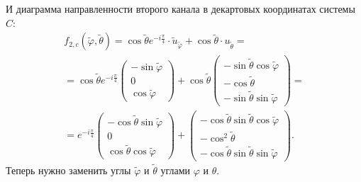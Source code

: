 И диаграмма направленности второго канала в декартовых координатах системы $C$:
\begin{multline*}
    f_{2,c}(\widetilde{\varphi}, \widetilde{\theta})
    = \cos \widetilde{\theta} e^{-i\frac{\pi}{4}} \cdot \widetilde{u}_{\widetilde{\varphi}} + \cos \widetilde{\theta} \cdot u_{\widetilde{\theta}} = \\
    = \cos \widetilde{\theta}  e^{-i\frac{\pi}{4}}
    \begin{pmatrix}
        - \sin \widetilde{\varphi} \\
        0                          \\
        \cos \widetilde{\varphi}
    \end{pmatrix}
    + \cos \widetilde{\theta}
    \begin{pmatrix}
        - \sin \widetilde{\theta} \cos \widetilde{\varphi} \\
        - \cos \widetilde{\theta}                          \\
        - \sin \widetilde{\theta} \sin \widetilde{\varphi}
    \end{pmatrix} = \\
    = e^{-i\frac{\pi}{4}}
    \begin{pmatrix}
        - \cos \widetilde{\theta}  \sin \widetilde{\varphi} \\
        0                                                   \\
        \cos \widetilde{\theta} \cos \widetilde{\varphi}
    \end{pmatrix}
    + \begin{pmatrix}
        - \cos \widetilde{\theta} \sin \widetilde{\theta} \cos \widetilde{\varphi} \\
        - \cos^2 \widetilde{\theta}                                                \\
        - \cos \widetilde{\theta} \sin \widetilde{\theta} \sin \widetilde{\varphi}
    \end{pmatrix} .
\end{multline*}
Теперь нужно заменить углы $\widetilde{\varphi}$ и $\widetilde{\theta}$ углами $\varphi$ и $\theta$.

